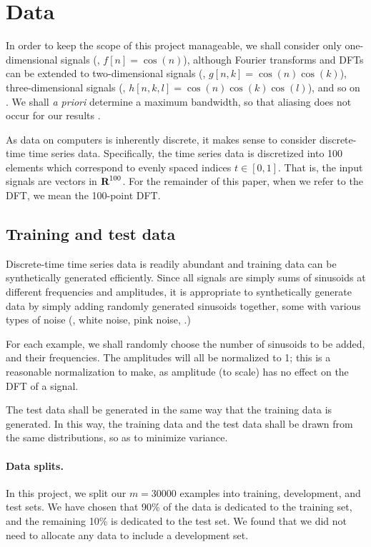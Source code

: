 \documentclass[12pt]{article}
\begin{document}
\section{Data}

In order to keep the scope of this project manageable, we shall consider only one-dimensional signals (\eg, 
$f[n] = \cos(n)$), although Fourier transforms and DFTs can be extended to two-dimensional signals 
(\eg, $g[n,k] = \cos(n)\cos(k)$), three-dimensional signals (\eg, $h[n,k,l] = \cos(n)\cos(k)\cos(l)$), and 
so on \cite{O:17}.
We shall \emph{a priori} determine a maximum bandwidth, so that aliasing does not occur for our results \cite{OS:99}.

As data on computers is inherently discrete, it makes sense to consider discrete-time time series data.
Specifically, the time series data is discretized into 100 elements which correspond to evenly spaced 
indices $t \in [0,1]$. That is, the input signals are vectors in ${\mbox{\bf R}}^{100}$. For the remainder of
this paper, when we refer to the DFT, we mean the 100-point DFT. 


\subsection{Training and test data} Discrete-time time series data is readily abundant and 
training data can be synthetically generated efficiently. Since all signals are simply sums of 
sinusoids at different frequencies and amplitudes, it is appropriate to synthetically generate
data by simply adding randomly generated sinusoids together, some with various types of noise 
(\eg, white noise, pink noise, \etc.)

For each example, we shall randomly choose the number of sinusoids 
to be added, and their frequencies. The amplitudes will all be normalized to 1; this is a reasonable 
normalization to make, as amplitude (to scale) has no effect on the DFT of a signal.

The test data shall be generated in the same way that the training data is
generated. In this way, the training data and the test data shall be drawn from the same distributions,
so as to minimize variance.

\paragraph{Data splits.} In this project, we split our $m=30000$ examples into training, development, and test
sets. We have chosen that 90\% of the data is dedicated to the training set, and the remaining 10\% is 
dedicated to the test set. We found that we did not need to allocate any data to include a development set.
\end{document}
